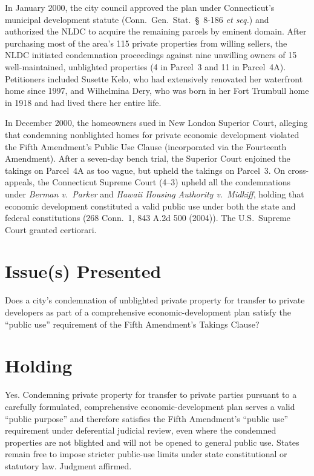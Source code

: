 \documentclass[12pt]{article}
\begin{document}
In January 2000, the city council approved the plan under Connecticut's municipal development statute (Conn.\ Gen.\ Stat.\ \S~8-186 \textit{et seq.}) and authorized the NLDC to acquire the remaining parcels by eminent domain. After purchasing most of the area's 115 private properties from willing sellers, the NLDC initiated condemnation proceedings against nine unwilling owners of 15 well-maintained, unblighted properties (4 in Parcel~3 and 11 in Parcel~4A). Petitioners included Susette Kelo, who had extensively renovated her waterfront home since 1997, and Wilhelmina Dery, who was born in her Fort Trumbull home in 1918 and had lived there her entire life.

In December 2000, the homeowners sued in New London Superior Court, alleging that condemning nonblighted homes for private economic development violated the Fifth Amendment's Public Use Clause (incorporated via the Fourteenth Amendment). After a seven-day bench trial, the Superior Court enjoined the takings on Parcel~4A as too vague, but upheld the takings on Parcel~3. On cross-appeals, the Connecticut Supreme Court (4--3) upheld all the condemnations under \textit{Berman v.\ Parker} and \textit{Hawaii Housing Authority v.\ Midkiff}, holding that economic development constituted a valid public use under both the state and federal constitutions (268 Conn.\ 1, 843 A.2d 500 (2004)). The U.S.\ Supreme Court granted certiorari.

\section{Issue(s) Presented}
Does a city's condemnation of unblighted private property for transfer to private developers as part of a comprehensive economic-development plan satisfy the ``public use'' requirement of the Fifth Amendment's Takings Clause?

\section{Holding}
Yes. Condemning private property for transfer to private parties pursuant to a carefully formulated, comprehensive economic-development plan serves a valid ``public purpose'' and therefore satisfies the Fifth Amendment's ``public use'' requirement under deferential judicial review, even where the condemned properties are not blighted and will not be opened to general public use. States remain free to impose stricter public-use limits under state constitutional or statutory law. Judgment affirmed.
\end{document}
